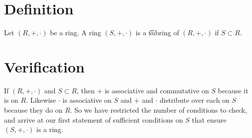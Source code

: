 
\section*{Definition}

Let $(R, +, \cdot )$ be a ring.
A ring $(S, +, \cdot )$ is a \t{subring} of $(R, +, \cdot )$ if $S \subset R$.

\section*{Verification}

If $(R, +, \cdot )$ and $S \subset R$, then $+$ is associative and commutative on $S$ because it is on $R$. Likewise $\cdot $ is associative on $S$ and $+$ and $\cdot $ distribute over each on $S$ because they do on $R$.
So we have restricted the number of conditions to check, and arrive at our first statement of sufficient conditions on $S$ that ensure $(S, +, \cdot )$ is a ring.

\blankpage